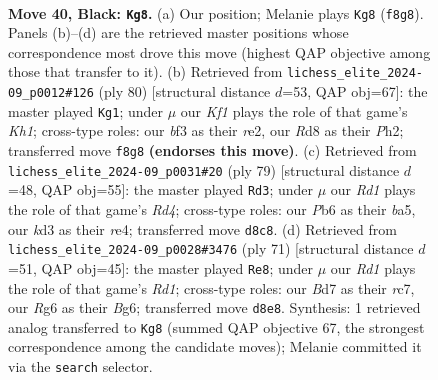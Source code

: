 \documentclass[11pt]{article}
\begin{document}
\clearpage

\begin{figure}[p]\centering
\begin{subfigure}{0.46\textwidth}\centering
\resizebox{\linewidth}{!}{%
\newchessgame
\chessboard[
  setfen={3r1k2/3b1p1p/1p4r1/p7/P2p2P1/1P1K1BRN/7P/2R5 b - - 1 40},
  showmover=false,
  pgfstyle=straightmove, color=movearrow, markmove={f8-g8}
]}
\caption{}
\end{subfigure}\hfill
\begin{subfigure}{0.46\textwidth}\centering
\resizebox{\linewidth}{!}{%
\newchessgame
\chessboard[
  setfen={8/3r1pk1/7p/2R3p1/P1B3P1/1P1p1P1b/4r2P/3R3K w - - 7 41},
  showmover=false,
  pgfstyle=straightmove, color=movearrow, markmove={h1-g1}
]}
\caption{}
\end{subfigure}
\\[4pt]
\begin{subfigure}{0.46\textwidth}\centering
\resizebox{\linewidth}{!}{%
\newchessgame
\chessboard[
  setfen={6k1/3b3p/6r1/B1pr4/P1p1R1P1/2P4P/1P6/4R1K1 b - - 0 40},
  showmover=false,
  pgfstyle=straightmove, color=movearrow, markmove={d5-d3}
]}
\caption{}
\end{subfigure}\hfill
\begin{subfigure}{0.46\textwidth}\centering
\resizebox{\linewidth}{!}{%
\newchessgame
\chessboard[
  setfen={1r1r1k2/1PR2ppp/4p1b1/p7/2B1PK2/5P2/7P/1R6 b - - 2 36},
  showmover=false,
  pgfstyle=straightmove, color=movearrow, markmove={d8-e8}
]}
\caption{}
\end{subfigure}
\caption{\textbf{Move 40, Black: \texttt{Kg8}.} (a) Our position; Melanie plays \texttt{Kg8} (\texttt{f8g8}). Panels (b)--(d) are the retrieved master positions whose correspondence most drove this move (highest QAP objective among those that transfer to it). (b) Retrieved from \texttt{lichess\_elite\_2024-09\_p0012\#126} (ply 80) [structural distance $d$=53, QAP obj=67]: the master played \texttt{Kg1}; under $\mu$ our \emph{Kf1} plays the role of that game's \emph{Kh1}; cross-type roles: our \emph{b}f3 as their \emph{r}e2, our \emph{R}d8 as their \emph{P}h2; transferred move \texttt{f8g8} \textbf{(endorses this move)}. (c) Retrieved from \texttt{lichess\_elite\_2024-09\_p0031\#20} (ply 79) [structural distance $d$=48, QAP obj=55]: the master played \texttt{Rd3}; under $\mu$ our \emph{Rd1} plays the role of that game's \emph{Rd4}; cross-type roles: our \emph{P}b6 as their \emph{b}a5, our \emph{k}d3 as their \emph{r}e4; transferred move \texttt{d8c8}. (d) Retrieved from \texttt{lichess\_elite\_2024-09\_p0028\#3476} (ply 71) [structural distance $d$=51, QAP obj=45]: the master played \texttt{Re8}; under $\mu$ our \emph{Rd1} plays the role of that game's \emph{Rd1}; cross-type roles: our \emph{B}d7 as their \emph{r}c7, our \emph{R}g6 as their \emph{B}g6; transferred move \texttt{d8e8}. Synthesis: 1 retrieved analog transferred to \texttt{Kg8} (summed QAP objective 67, the strongest correspondence among the candidate moves); Melanie committed it via the \texttt{search} selector.}
\label{fig:thought-m79}
\end{figure}
\end{document}
